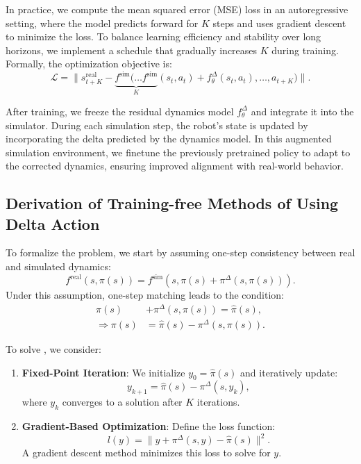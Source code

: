 In practice, we compute the mean squared error (MSE) loss in an autoregressive setting, where the model predicts forward for $K$ steps and uses gradient descent to minimize the loss. To balance learning efficiency and stability over long horizons, we implement a schedule that gradually increases $K$ during training. Formally, the optimization objective is:
\[
\mathcal{L}= \bigg\lVert s^\text{real}_{t+K} - \underbrace{f^\text{sim} \big( \dots f^\text{sim}}_{K} (s_t, a_t) + f^\Delta_\theta(s_t, a_t), \dots, a_{t+K} \big) \bigg\rVert.
\]

After training, we freeze the residual dynamics model $f^\Delta_\theta$ and integrate it into the simulator. During each simulation step, the robot's state is updated by incorporating the delta predicted by the dynamics model. In this augmented simulation environment, we finetune the previously pretrained policy to adapt to the corrected dynamics, ensuring improved alignment with real-world behavior.

\subsection{Derivation of Training-free Methods of Using Delta Action}
\label{sec:appendix_more_deltaA_usage}
To formalize the problem, we start by assuming one-step consistency between real and simulated dynamics:
\[
f^\text{real}(s, \pi(s)) = f^\text{sim}(s, \pi(s) + \pi^\Delta(s, \pi(s))).
\]
Under this assumption, one-step matching leads to the condition:
\begin{align}
    \pi(s) &+ \pi^\Delta(s, \pi(s)) = \hat{\pi}(s), \\
    \Rightarrow \pi(s) &= \hat{\pi}(s) - \pi^\Delta(s, \pi(s)).
    \label{eq:solve_pi}
\end{align}

To solve , we consider:
\begin{enumerate}
    \item \textbf{Fixed-Point Iteration}: We initialize \(y_0 = \hat{\pi}(s)\) and iteratively update:
   \begin{equation}
       y_{k+1} = \hat{\pi}(s) - \pi^\Delta(s, y_k),
       \label{eq:fix_point}
   \end{equation}
   where \(y_k\) converges to a solution after \(K\) iterations.

    \item \textbf{Gradient-Based Optimization}: Define the loss function:
    \begin{equation}
       l(y) = \| y + \pi^\Delta(s, y) - \hat{\pi}(s) \|^2.
    \end{equation}
    A gradient descent method minimizes this loss to solve for \(y\).
\end{enumerate}


